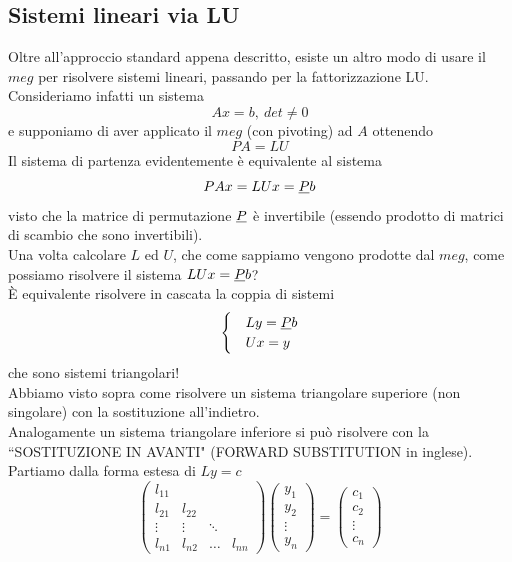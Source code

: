 \documentclass[12pt,a4paper]{article}
\begin{document}
\subsection{Sistemi lineari via LU}
Oltre all'approccio standard appena descritto, esiste un altro modo di usare il $meg$ per risolvere sistemi lineari, passando per la fattorizzazione LU. \\
Consideriamo infatti un sistema
\begin{equation*}
    Ax=b, \ det \neq 0
\end{equation*}
e supponiamo di aver applicato il $meg$ (con pivoting) ad $A$ ottenendo
\begin{equation*}
    PA = LU
\end{equation*}
Il sistema di partenza evidentemente è equivalente al sistema
\begin{equation*}
    PAx=LUx=\uline{P}b
\end{equation*}
visto che la matrice di permutazione $\uline{P}$ è invertibile (essendo prodotto di matrici di scambio che sono invertibili). \\
Una volta calcolare $L$ ed $U$, che come sappiamo vengono prodotte dal $meg$, come possiamo risolvere il sistema $LUx=\uline{P}b$?\\
È equivalente risolvere in cascata la coppia di sistemi
\begin{equation*}
    \begin{cases}
        &Ly = \uline{P}b \\
        &Ux = y
    \end{cases}
\end{equation*}
che sono sistemi triangolari! \\
Abbiamo visto sopra come risolvere un sistema triangolare superiore (non singolare) con la sostituzione all'indietro. \\
Analogamente un sistema triangolare inferiore si può risolvere con la ``SOSTITUZIONE IN AVANTI" (FORWARD SUBSTITUTION in inglese). \\
Partiamo dalla forma estesa di $Ly = c$
\begin{equation*}
    \begin{pmatrix}
        l_{11} & & & \\
        l_{21} & l_{22} & & \\
        \vdots & \vdots & \ddots & \\
        l_{n1} & l_{n2} & \dots & l_{nn} 
    \end{pmatrix}
    \begin{pmatrix}
        y_1\\
        y_2 \\
        \vdots \\
        y_n 
    \end{pmatrix} = 
    \begin{pmatrix}
        c_1\\
        c_2 \\
        \vdots \\
        c_n 
    \end{pmatrix}
\end{equation*}
\end{document}
